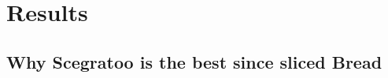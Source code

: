 
\section{Results}\label{results}


\subsection{Why Scegratoo is the best since sliced
Bread}\label{why-scegratoo-is-the-best-since-sliced-bread}
